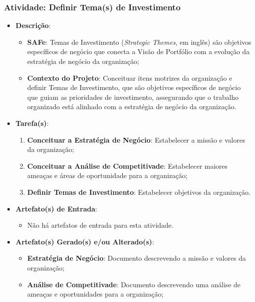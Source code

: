 			\subsubsection[Atividade: Definir Tema(s) de Investimento]{Atividade: Definir Tema(s) de Investimento}
			\label{subsubsec:processo_atividade_portfolio_definir_tema}
				\begin{itemize}
					\item{\textbf{Descrição}:
						\begin{itemize}
							\item{\textbf{SAFe}: Temas de Investimento (\emph{Strategic Themes}, em inglês) são objetivos específicos de negócio que conecta a Visão de Portfólio com a evolução da estratégia de negócio da organização;}
							\item{\textbf{Contexto do Projeto}: Conceituar itens motrizes da organização e definir Temas de Investimento, que são objetivos específicos de negócio que guiam as prioridades de investimento, assegurando que o trabalho organizado está alinhado com a estratégia de negócio da organização.}
						\end{itemize}}
					\item{\textbf{Tarefa(s)}:
						\begin{enumerate}
							\item{\textbf{Conceituar a Estratégia de Negócio}: Estabelecer a missão e valores da organização;}
							\item{\textbf{Conceituar a Análise de Competitivade}: Estabelecer maiores ameaças e áreas de oportunidade para a organização;}
							\item{\textbf{Definir Temas de Investimento}: Estabelecer objetivos da organização.}
						\end{enumerate}}
					\item{\textbf{Artefato(s) de Entrada}:
						\begin{itemize}
							\item{Não há artefatos de entrada para esta atividade.}
						\end{itemize}}
					\item{\textbf{Artefato(s) Gerado(s) e/ou Alterado(s)}:
						\begin{itemize}
							\item{\textbf{Estratégia de Negócio}: Documento descrevendo a missão e valores da organização;}
							\item{\textbf{Análise de Competitivade}: Documento descrevendo uma análise de ameaças e oportunidades para a organização;}

\end{itemize}}
\end{itemize}
